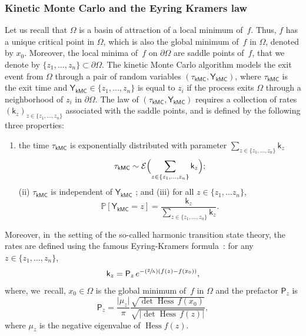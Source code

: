 \documentclass[JEP,XML,SOM,Unicode,NoEqCountersInSection,NoFloatCountersInSection,published]{cedram}
\newenvironment{enumeratei}
{\bgroup\def\theenumi{\roman{enumi}}\def\theenumii{\arabic{enumii}}\begin{enumerate}}
{\end{enumerate}\egroup}
\newcommand{\Psfrac}[2]{(\sfrac{#1}{#2})}
\DeclareMathOperator{\hess}{Hess}\let\Hess\hess
\theoremstyle{plain}
\theoremstyle{definition}
\begin{document}
\subsubsection*{Kinetic Monte Carlo and the Eyring Kramers law}
Let us recall that $\Omega$ is a basin of attraction of a local
minimum of~$f$. Thus, $f$ has a unique critical point
in $\Omega$, which is also the global minimum of~$f$ in $\Omega$,
denoted by $x_0$. Moreover, the local minima of~$f$ on $\partial
\Omega$ are saddle points of~$f$, that we denote by $\{z_1, \ldots, z_n\} \subset \partial \Omega$. The kinetic
Monte Carlo algorithm models the exit event from $\Omega$ through a
pair of random variables $(\tau_{\mathsf {kMC}}, \mathsf Y_{\mathsf
{kMC}})$, where $\tau_{\mathsf{kMC}}$ is the exit time and $\mathsf
Y_{\mathsf {kMC}} \in \{z_1, \ldots, z_n\}$ is equal to $z_i$ if the
process exits $\Omega$ through a neighborhood of $z_i$ in $\partial
\Omega$. The law of $(\tau_{\mathsf {kMC}}, \mathsf Y_{\mathsf
{kMC}})$ requires a collection of rates $(\mathsf k_{z})_{z \in \{z_1,
\ldots, z_n\}}$ associated with
the saddle points, and is defined by the following three properties:
\begin{enumeratei}
\item
the time $ \tau_{\mathsf {kMC}}$ is exponentially distributed
with parameter $\sum_{z \in \{z_1,
\ldots, z_n\}} \mathsf k_{z}$
\begin{equation}\label{eq.k_temps}
\tau_{\mathsf {kMC}} \sim\mathcal E\Bigl(\sum_{z \in \{z_1,
\ldots, z_n\}} \mathsf k_{z}\Bigr);
\end{equation}
(ii) $\tau_{\mathsf {kMC}}$ is independent of $\mathsf Y_{\mathsf
{kMC}}$ ; and (iii) for all $z \in \{z_1, \ldots z_n\}$,
\begin{equation}\label{eq.YY}
\mathbb P[\mathsf Y_{\mathsf {kMC}}=z]= \frac{\mathsf k_{z}}{\sum_{z \in \{z_1,
\ldots, z_n\}} \mathsf k_{z}}.
\end{equation}
\end{enumeratei}
Moreover, in~the setting of the so-called harmonic transition state theory, the
rates are defined using the famous Eyring-Kramers
formula~\cite{hanggi-talkner-barkovec-90,voter-05}: for any $z \in
\{z_1, \ldots,z_n\}$,
\begin{equation}\label{eq.ek}
\mathsf k_{z}=\mathsf P_{z}\, e^{-\Psfrac 2h (f(z)-f(x_0))},
\end{equation}
where, we~recall, $x_0\in \Omega$ is the global minimum of~$f$ in
$\Omega$ and the prefactor $\mathsf P_{z}$ is
\begin{equation}\label{eq.prefactor}
\mathsf P_{z}=\frac{\vert \mu_{z}\vert}{\pi }\frac{ \sqrt{{\det\Hess}\, f (x_0) } }{ \sqrt{\vert {\det \Hess}\, f(z) \vert } },
\end{equation}
where $\mu_{z}$ is the negative eigenvalue of $\hess f(z)$.
\end{document}
